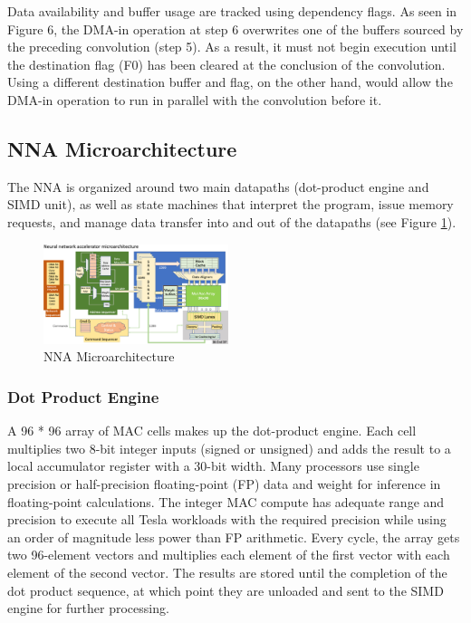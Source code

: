 \documentclass[letterpaper, 10 pt, conference]{ieeeconf}  %
\begin{document}
Data availability and buffer usage are tracked using dependency flags. As seen in Figure 6, the DMA-in operation at step 6 overwrites one of the buffers sourced by the preceding convolution (step 5). As a result, it must not begin execution until the destination flag (F0) has been cleared at the conclusion of the convolution. Using a different destination buffer and flag, on the other hand, would allow the DMA-in operation to run in parallel with the convolution before it.

\subsection{NNA Microarchitecture}
The NNA is organized around two main datapaths (dot-product engine and SIMD unit), as well as state machines that interpret the program, issue memory requests, and manage data transfer into and out of the datapaths (see Figure \ref{NNA_Microarchitecture}).

\begin{figure}[hbt!]
\centering
\includegraphics[width=0.48\textwidth]{gfx/nna_microarchitecture.png}
\caption{NNA Microarchitecture}
\label{NNA_Microarchitecture}
\end{figure}

\subsubsection{Dot Product Engine}
A 96 * 96 array of MAC cells makes up the dot-product engine. Each cell multiplies two 8-bit integer inputs (signed or unsigned) and adds the result to a local accumulator register with a 30-bit width. Many processors use single precision or half-precision floating-point (FP) data and weight for inference in floating-point calculations. The integer MAC compute has adequate range and precision to execute all Tesla workloads with the required precision while using an order of magnitude less power than FP arithmetic. Every cycle, the array gets two 96-element vectors and multiplies each element of the first vector with each element of the second vector. The results are stored until the completion of the dot product sequence, at which point they are unloaded and sent to the SIMD engine for further processing.
\end{document}
